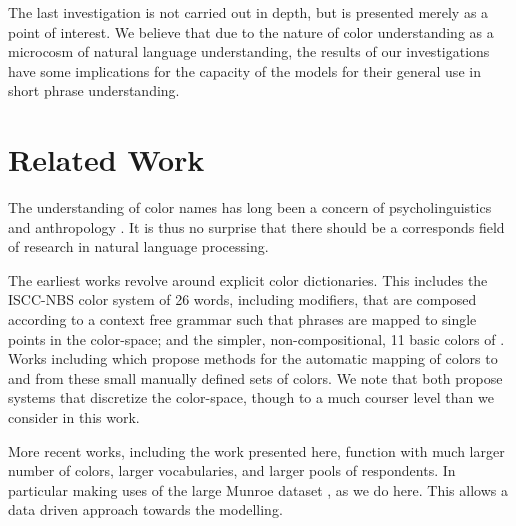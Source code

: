 \documentclass[11pt,a4paper]{article}
\newcommand{\parencite}{\citep}
\newcommand{\textcite}{\citet}
\begin{document}
The last investigation is not carried out in depth, but is presented merely as a point of interest.
We believe that due to the nature of color understanding as a microcosm of natural language understanding, the results of our investigations have some implications for the capacity of the models for their general use in short phrase understanding.


\section{Related Work}\label{sec:related-work}
The understanding of color names has long been a concern of psycholinguistics and anthropology  \parencite{berlin1969basic,heider1972universals,HEIDER1972337,mylonas2015use}.
It is thus no surprise that there should be a corresponds field of research in natural language processing.

The earliest works revolve around explicit color dictionaries.
This includes the ISCC-NBS color system \parencite{kelly1955iscc} of 26 words, including modifiers, that are composed according to a context free grammar such that phrases are mapped to single points in the color-space;
and the simpler, non-compositional, 11 basic colors of \textcite{berlin1969basic}.
Works including \textcite{Berk:1982:HFS:358589.358606,conway1992experimental,ele1994computational, mojsilovic2005computational, menegaz2007discrete,van2009learning} which propose methods for the automatic mapping of colors to and from these small manually defined sets of colors.
We note that \textcite{menegaz2007discrete,van2009learning} both propose systems that discretize the color-space, though to a much courser level than we consider in this work.


More recent works, including the work presented here, function with much larger number of colors, larger vocabularies, and larger pools of respondents.
In particular making uses of the large Munroe dataset \textcite{Munroe2010XKCDdataset}, as we do here.
This allows a data driven approach towards the modelling.
\end{document}
